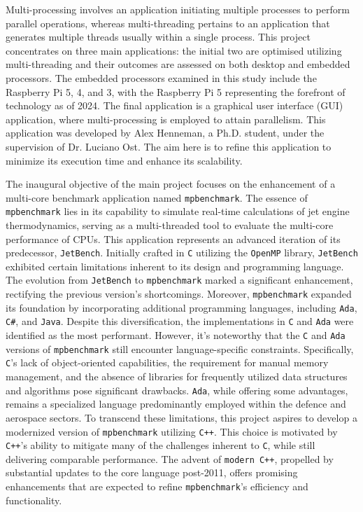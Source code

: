 \documentclass[12pt]{article}
\begin{document}
Multi-processing involves an application initiating multiple processes to perform parallel operations, whereas multi-threading pertains to an application that generates multiple threads usually within a single process. This project concentrates on three main applications: the initial two are optimised utilizing multi-threading and their outcomes are assessed on both desktop and embedded processors. The embedded processors examined in this study include the Raspberry Pi 5, 4, and 3, with the Raspberry Pi 5 representing the forefront of technology as of 2024. The final application is a graphical user interface (GUI) application, where multi-processing is employed to attain parallelism. This application was developed by Alex Henneman, a Ph.D. student, under the supervision of Dr. Luciano Ost. The aim here is to refine this application to minimize its execution time and enhance its scalability. 

The inaugural objective of the main project focuses on the enhancement of a multi-core benchmark application named \texttt{mpbenchmark}. The essence of \texttt{mpbenchmark} lies in its capability to simulate real-time calculations of jet engine thermodynamics, serving as a multi-threaded tool to evaluate the multi-core performance of CPUs. This application represents an advanced iteration of its predecessor, \texttt{JetBench}. Initially crafted in \texttt{C} utilizing the \texttt{OpenMP} library, \texttt{JetBench} exhibited certain limitations inherent to its design and programming language. The evolution from \texttt{JetBench} to \texttt{mpbenchmark} marked a significant enhancement, rectifying the previous version's shortcomings. Moreover, \texttt{mpbenchmark} expanded its foundation by incorporating additional programming languages, including \texttt{Ada}, \texttt{C\#}, and \texttt{Java}. Despite this diversification, the implementations in \texttt{C} and \texttt{Ada} were identified as the most performant. However, it's noteworthy that the \texttt{C} and \texttt{Ada} versions of \texttt{mpbenchmark} still encounter language-specific constraints. Specifically, \texttt{C}'s lack of object-oriented capabilities, the requirement for manual memory management, and the absence of libraries for frequently utilized data structures and algorithms pose significant drawbacks. \texttt{Ada}, while offering some advantages, remains a specialized language predominantly employed within the defence and aerospace sectors. To transcend these limitations, this project aspires to develop a modernized version of \texttt{mpbenchmark} utilizing \texttt{C++}. This choice is motivated by \texttt{C++}'s ability to mitigate many of the challenges inherent to \texttt{C}, while still delivering comparable performance. The advent of \texttt{modern C++}, propelled by substantial updates to the core language post-2011, offers promising enhancements that are expected to refine \texttt{mpbenchmark}'s efficiency and functionality.
\end{document}
